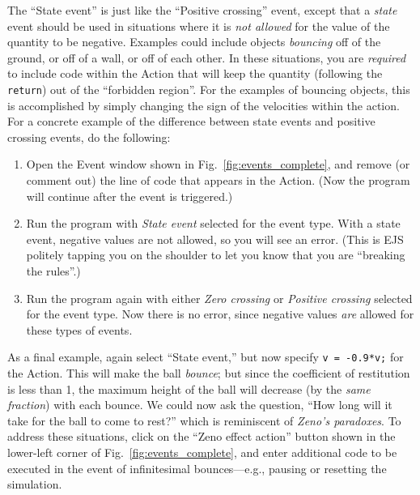 The ``State event'' is just like the ``Positive crossing'' event, except that a \emph{state} event should be used in situations where it is \emph{not allowed} for the value of the quantity to be negative.  Examples could include objects \emph{bouncing} off of the ground, or off of a wall, or off of each other.  In these situations, you are \emph{required} to include code within the Action that will keep the quantity (following the \verb+return+) out of the ``forbidden region''.  For the examples of bouncing objects, this is accomplished by simply changing the sign of the velocities within the action.  For a concrete example of the difference between state events and positive crossing events, do the following:
\begin{enumerate}
\item Open the Event window shown in Fig.~\ref{fig:events_complete}, and remove (or comment out) the line of code that appears in the Action.  (Now the program will continue after the event is triggered.)
\item Run the program with \emph{State event} selected for the event type.  With a state event, negative values are not allowed, so you will see an error.  (This is EJS politely tapping you on the shoulder to let you know that you are ``breaking the rules''.)
\item Run the program again with either \emph{Zero crossing} or \emph{Positive crossing} selected for the event type.  Now there is no error, since negative values \emph{are} allowed for these types of events.
\end{enumerate}

As a final example, again select ``State event,'' but now specify \verb+v = -0.9*v;+ for the Action.  This will make the ball \emph{bounce}; but since the coefficient of restitution is less than 1, the maximum height of the ball will decrease (by the \emph{same fraction}) with each bounce.  We could now ask the question, ``How long will it take for the ball to come to rest?'' which is reminiscent of \emph{Zeno's paradoxes}.  To address these situations, click on the ``Zeno effect action'' button shown in the lower-left corner of Fig.~\ref{fig:events_complete}, and enter additional code to be executed in the event of infinitesimal bounces---e.g., pausing or resetting the simulation.



